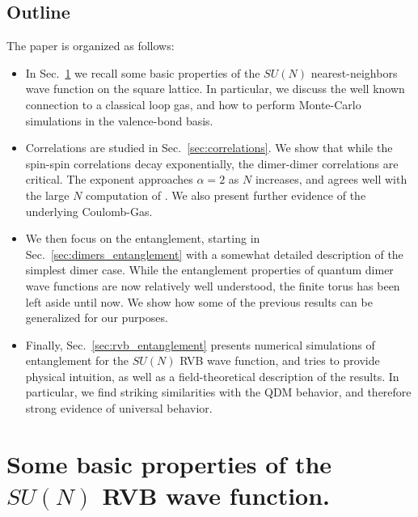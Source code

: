 \documentclass[11pt]{iopart}
\begin{document}
 \subsection{Outline}
 The paper is organized as follows:
 \begin{itemize}
 \item In Sec.~\ref{sec:basics} we recall some basic properties of the $SU(N)$ nearest-neighbors wave function on the square lattice. In particular, we discuss the well known connection to a classical loop gas\cite{Sutherland_loops}, and how to perform Monte-Carlo simulations in the valence-bond basis.
 \item Correlations are studied in Sec.~\ref{sec:correlations}. We show that while the spin-spin correlations decay exponentially, the dimer-dimer correlations are critical. The exponent approaches $\alpha=2$ as $N$ increases, and agrees well with the large $N$ computation of \cite{Damle}. We also present further evidence of the underlying Coulomb-Gas.
 \item We then focus on the entanglement, starting in Sec.~\ref{sec:dimers_entanglement} with a somewhat detailed description of the simplest dimer case. While the entanglement properties of quantum dimer wave functions are now relatively well understood, the finite torus has been left aside until now. We show how some of the previous  results can be generalized for our purposes. 
 \item Finally, Sec.~\ref{sec:rvb_entanglement} presents numerical simulations of entanglement for the $SU(N)$ RVB wave function, and tries to provide physical intuition, as well as a field-theoretical description of the results. In particular, we find striking similarities with the QDM behavior, and therefore strong evidence of universal behavior. 
\end{itemize}
\section{Some basic properties of the $SU(N)$ RVB wave function.}
\label{sec:basics}
\end{document}
